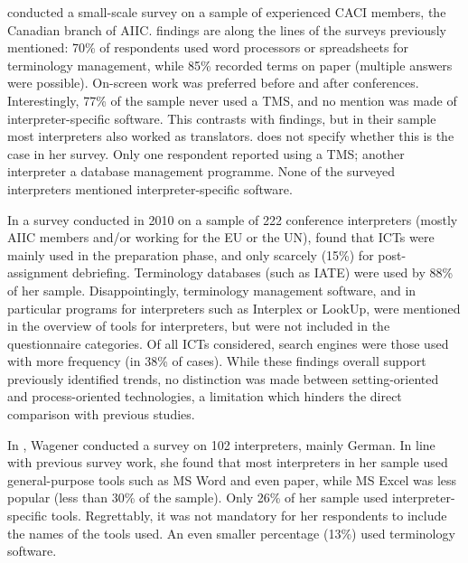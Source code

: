 \citet{bilgen_investigating_2009} conducted a small-scale survey on a sample of experienced CACI members, the Canadian branch of AIIC.  findings are along the lines of the surveys previously mentioned: 70\% of respondents used word processors or spreadsheets for terminology management, while 85\% recorded terms on paper (multiple answers were possible). On-screen work was preferred before and after conferences. Interestingly, 77\% of the sample never used a TMS, and no mention was made of interpreter-specific software. This contrasts with  findings, but in their sample most interpreters also worked as translators. \citet{bilgen_investigating_2009} does not specify whether this is the case in her survey. Only one respondent reported using a TMS; another interpreter a database management programme. None of the surveyed interpreters mentioned interpreter-specific software.

In a survey conducted in 2010 on a sample of 222 conference interpreters (mostly AIIC members and/or working for the EU or the UN), \citet{berber-irabien_information_2010} found that ICTs were mainly used in the preparation phase, and only scarcely (15\%) for post-assignment debriefing. Terminology databases (such as IATE) were used by 88\% of her sample. Disappointingly, terminology management software, and in particular programs for interpreters such as Interplex or LookUp, were mentioned in the overview of tools for interpreters, but were not included in the questionnaire categories. Of all ICTs considered\footnotemark, search engines were those used with more frequency (in 38\% of cases). While these findings overall support previously identified trends, no distinction was made between setting-oriented and process-oriented technologies, a limitation which hinders the direct comparison with previous studies.

In \citeyear{wagener2012vorbereitende}, Wagener conducted a survey on 102 interpreters, mainly German. In line with previous survey work, she found that most interpreters in her sample used general-purpose tools such as MS Word and even paper, while MS Excel was less popular (less than 30\% of the sample). Only 26\% of her sample used interpreter-specific tools. Regrettably, it was not mandatory for her respondents to include the names of the tools used. An even smaller percentage (13\%) used terminology software.

